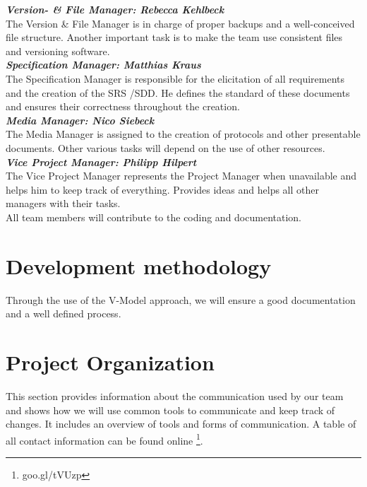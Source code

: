 \documentclass[11pt,a4paper]{article}
\begin{document}
\textbf{\textit{Version- \& File Manager: Rebecca Kehlbeck}} \\
{\footnotesize The Version \& File Manager is in charge of proper backups and a well-conceived file structure. Another important task is to make the team use consistent files and versioning software. }\\

\textbf{\textit{Specification Manager: Matthias Kraus}} \\
{\footnotesize The Specification Manager is responsible for the elicitation of all requirements and the creation of the SRS \slash SDD. He defines the standard of these documents and ensures their correctness throughout the creation.} \\

\textbf{\textit{Media Manager: Nico Siebeck}} \\
{\footnotesize The Media Manager is assigned to the creation of protocols and other presentable documents. Other various tasks will depend on the use of other resources.}\\

\textbf{\textit{Vice Project Manager: Philipp Hilpert }}\\
{\footnotesize The Vice Project Manager represents the Project Manager when unavailable and helps him to keep track of everything. Provides ideas and helps all other managers with their tasks.  } \\

All team members will contribute to the coding and documentation.


\section{Development methodology}

Through the use of the V-Model approach, we will ensure a good documentation and a well defined process.

\section{Project Organization}

This section provides information about the communication used by our team and shows how we will use common tools to communicate and keep track of changes. It includes an overview of tools and forms of communication. A table of all contact information can be found online \footnote[1]{goo.gl/tVUzp}.
\end{document}
